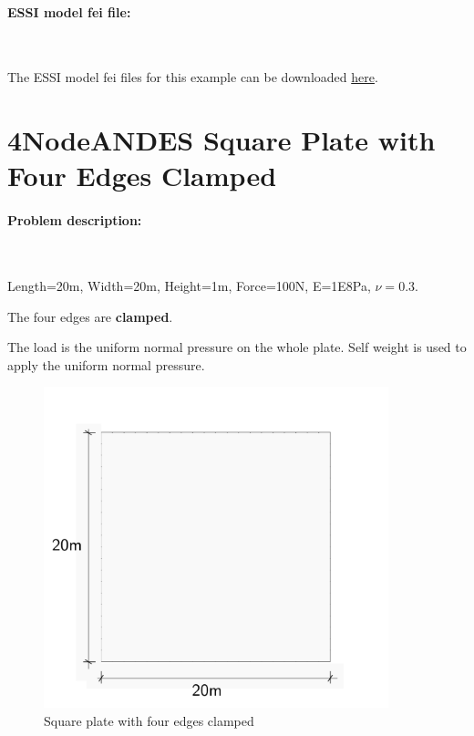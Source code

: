 \documentclass[fleqn,11pt]{article}
\begin{document}
\paragraph{ESSI model fei file: } ~




The ESSI model fei files for this example can be downloaded \href{https://github.com/BorisJeremic/Real-ESSI-Examples/blob/master/model_fei_file/27NodeBrick_dynamic_impose_motion/27NodeBrick_dynamic_impose_motion.tgz?raw=true}{here}.











\newpage
\section{4NodeANDES Square Plate with Four Edges Clamped}



\paragraph{Problem description:} ~



Length=20m, Width=20m, Height=1m, Force=100N, E=1E8Pa, $\nu=0.3$. 

The four edges are \textbf{clamped}. 

The load is the uniform normal pressure on the whole plate. Self weight is used to apply the uniform normal pressure. 


\begin{figure}[H]
  \centering
  \includegraphics[width=10cm]{../Figure-files/square_plate_descrp.pdf}
  \caption{Square plate with four edges clamped }
  \label{fig 4NodeANDES edges clamped square plate with element side length for program description }
\end{figure}
\end{document}
